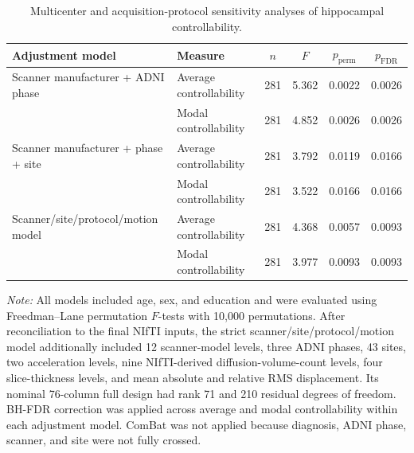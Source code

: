 \documentclass{article}
\begin{document}
\begin{table}[!htbp]
\centering
\caption{Multicenter and acquisition-protocol sensitivity analyses of hippocampal controllability.}
\label{tab:tableS8}
\small
\setlength{\tabcolsep}{4pt}
\renewcommand{\arraystretch}{1.12}
\begin{tabularx}{\textwidth}{@{}>{\raggedright\arraybackslash}X
                                  >{\raggedright\arraybackslash}p{3.0cm}
                                  cccc@{}}
\toprule
\textbf{Adjustment model} &
\textbf{Measure} &
\textbf{\(n\)} &
\textbf{\(F\)} &
\textbf{\(p_{\mathrm{perm}}\)} &
\textbf{\(p_{\mathrm{FDR}}\)}\\
\midrule
Scanner manufacturer + ADNI phase
  & Average controllability & 281 & 5.362 & 0.0022 & 0.0026\\
  & Modal controllability   & 281 & 4.852 & 0.0026 & 0.0026\\
\addlinespace
Scanner manufacturer + phase + site
  & Average controllability & 281 & 3.792 & 0.0119 & 0.0166\\
  & Modal controllability   & 281 & 3.522 & 0.0166 & 0.0166\\
\addlinespace
Scanner/site/protocol/motion model
  & Average controllability & 281 & 4.368 & 0.0057 & 0.0093\\
  & Modal controllability   & 281 & 3.977 & 0.0093 & 0.0093\\
\bottomrule
\end{tabularx}

\vspace{1mm}
\footnotesize{\textit{Note:} All models included age, sex, and education and were evaluated using Freedman--Lane permutation \(F\)-tests with 10,000 permutations. After reconciliation to the final NIfTI inputs, the strict scanner/site/protocol/motion model additionally included 12 scanner-model levels, three ADNI phases, 43 sites, two acceleration levels, nine NIfTI-derived diffusion-volume-count levels, four slice-thickness levels, and mean absolute and relative RMS displacement. Its nominal 76-column full design had rank 71 and 210 residual degrees of freedom. BH-FDR correction was applied across average and modal controllability within each adjustment model. ComBat was not applied because diagnosis, ADNI phase, scanner, and site were not fully crossed.}
\end{table}
\end{document}
